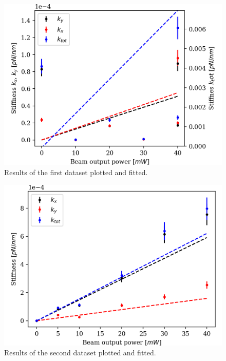 \vspace{-.5cm}
\begin{minipage}{\linewidth}
    \centering
    \begin{minipage}[l]{0.45\linewidth}
        \begin{figure}[H]
            \centering
            \includegraphics[width=\linewidth]{figures/beam.png}
            \caption{Results of the first dataset plotted and fitted.\\}
            \label{fig:bead-plot}
        \end{figure}
    \end{minipage}
    \hspace{0.05\linewidth}
    \begin{minipage}[r]{0.45\linewidth}
        \begin{figure}[H]
            \centering
            \includegraphics[width=\linewidth]{figures/trap.png}
            \caption{Results of the second dataset plotted and fitted.\\}
            \label{fig:trap-plot}
        \end{figure}
    \end{minipage}

\end{minipage}
\\

